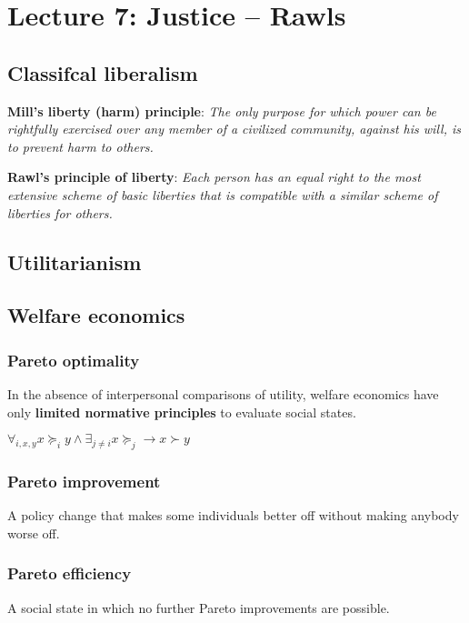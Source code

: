 \section{Lecture 7: Justice -- Rawls}

\subsection{Classifcal liberalism}

\textbf{Mill's liberty (harm) principle}:
\textit{The only purpose for which power can be rightfully exercised over any
member of a civilized community, against his will, is to prevent harm to
others.}

\textbf{Rawl's principle of liberty}:
\textit{Each person has an equal right to the most extensive scheme of basic
liberties that is compatible with a similar scheme of liberties for others.}

\subsection{Utilitarianism}

\subsection{Welfare economics}

\subsubsection{Pareto optimality}

In the absence of interpersonal comparisons of utility, welfare economics have
only \textbf{limited normative principles} to evaluate social states.

$\forall_{i, x, y} x \succeq_i y \land \exists_{j \neq i} x \succeq_j
\rightarrow x \succ y$

\subsubsection{Pareto improvement}

A policy change that makes some individuals better off without making anybody
worse off.

\subsubsection{Pareto efficiency}

A social state in which no further Pareto improvements are possible.

